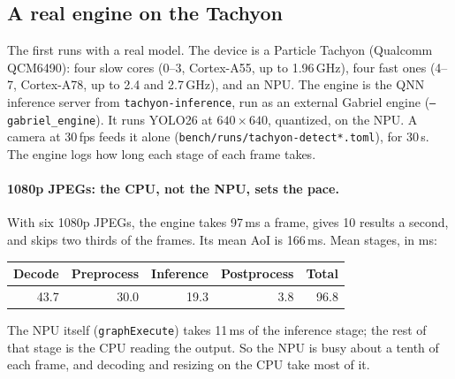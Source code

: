 \documentclass[11pt]{article}
\newcommand{\code}[1]{\texttt{#1}}
\begin{document}
\subsection{A real engine on the Tachyon}

The first runs with a real model. The device is a Particle Tachyon
(Qualcomm QCM6490): four slow cores (0--3, Cortex-A55, up to 1.96\,GHz),
four fast ones (4--7, Cortex-A78, up to 2.4 and 2.7\,GHz), and an NPU. The
engine is the QNN inference server from \code{tachyon-inference}, run as an
external Gabriel engine (\code{--gabriel\_engine}). It runs YOLO26 at
$640\times640$, quantized, on the NPU. A camera at 30\,fps feeds it alone
(\code{bench/runs/tachyon-detect*.toml}), for 30\,s. The engine logs how
long each stage of each frame takes.

\paragraph{1080p JPEGs: the CPU, not the NPU, sets the pace.} With six 1080p
JPEGs, the engine takes 97\,ms a frame, gives 10 results a second, and skips
two thirds of the frames. Its mean AoI is 166\,ms. Mean stages, in ms:
\begin{center}
\small
\begin{tabular}{@{}rrrrr@{}}
\toprule
Decode & Preprocess & Inference & Postprocess & Total \\
\midrule
43.7 & 30.0 & 19.3 & 3.8 & 96.8 \\
\bottomrule
\end{tabular}
\end{center}
The NPU itself (\code{graphExecute}) takes 11\,ms of the inference stage;
the rest of that stage is the CPU reading the output. So the NPU is busy
about a tenth of each frame, and decoding and resizing on the CPU take most
of it.
\end{document}
